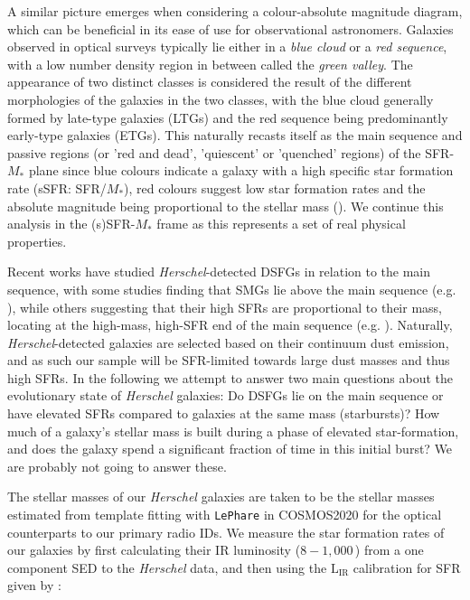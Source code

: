 A similar picture emerges when considering a colour-absolute magnitude diagram, which can be beneficial in its ease of use for observational astronomers. Galaxies observed in  optical surveys typically lie either in a \textit{blue cloud} or a \textit{red sequence}, with a low number density region in between called the \textit{green valley}. The appearance of two distinct classes is considered the result of the different morphologies of the galaxies in the two classes, with the blue cloud generally formed by late-type galaxies (LTGs) and the red sequence being predominantly early-type galaxies (ETGs). This naturally recasts itself as the main sequence and passive regions (or 'red and dead', 'quiescent' or 'quenched' regions) of the SFR-$M_*$ plane since blue colours indicate a galaxy with a high specific star formation rate (sSFR: SFR/$M_*$), red colours suggest low star formation rates and the absolute magnitude being proportional to the stellar mass (\citealt{Eales_2018}). We continue this analysis in the (s)SFR-$M_*$ frame as this represents a set of real physical properties.

Recent works have studied \textit{Herschel}-detected DSFGs in relation to the main sequence, with some studies finding that SMGs lie above the main sequence (e.g. \citealt{Hainline_2011}), while others suggesting that their high SFRs are proportional to their mass, locating at the high-mass, high-SFR end of the main sequence (e.g. \citealt{Michalowski_2012a}). Naturally, \textit{Herschel}-detected galaxies are selected based on their continuum dust emission, and as such our sample will be SFR-limited towards large dust masses and thus high SFRs. In the following we attempt to answer two main questions about the evolutionary state of \textit{Herschel} galaxies: Do DSFGs lie on the main sequence or have elevated SFRs compared to galaxies at the same mass (starbursts)? How much of a galaxy's stellar mass is built during a phase of elevated star-formation, and does the galaxy spend a significant fraction of time in this initial burst? {\color{red}We are probably not going to answer these.}

The stellar masses of our \textit{Herschel} galaxies are taken to be the stellar masses estimated from template fitting with \texttt{LePhare} in COSMOS2020 for the optical counterparts to our primary radio IDs. We measure the star formation rates of our galaxies by first calculating their IR luminosity ($8 - 1,000\,$\micron) from a one component SED to the \textit{Herschel} data, and then using the $\textrm{L}_{\textrm{IR}}$ calibration for SFR given by \citealt{Murphy_2011}:

